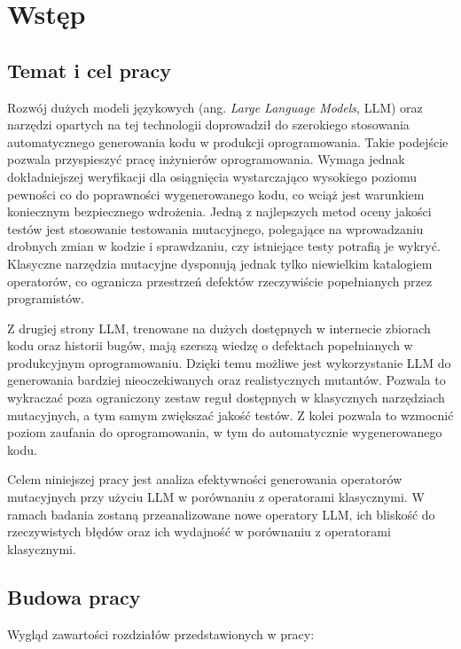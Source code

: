 \documentclass[12pt,a4paper,oldfontcommands]{memoir}
\theoremstyle{plain}
\theoremstyle{definition}
\theoremstyle{remark}
\begin{document}
    \clearpage
    \openany
    \chapter{Wstęp}
    \openright
    \section{Temat i cel pracy}

    Rozwój dużych modeli językowych (ang. \textit{Large Language Models}, LLM) oraz narzędzi opartych na tej technologii doprowadził do szerokiego stosowania automatycznego generowania kodu w produkcji oprogramowania.
    Takie podejście pozwala przyspieszyć pracę inżynierów oprogramowania.
    Wymaga jednak dokładniejszej weryfikacji dla osiągnięcia wystarczająco wysokiego poziomu pewności co do poprawności wygenerowanego kodu, co wciąż jest warunkiem koniecznym bezpiecznego wdrożenia.
    Jedną z najlepszych metod oceny jakości testów jest stosowanie testowania mutacyjnego, polegające na wprowadzaniu drobnych zmian w kodzie i sprawdzaniu, czy istniejące testy potrafią je wykryć.
    Klasyczne narzędzia mutacyjne dysponują jednak tylko niewielkim katalogiem operatorów, co ogranicza przestrzeń defektów rzeczywiście popełnianych przez programistów.

    Z drugiej strony LLM, trenowane na dużych dostępnych w internecie zbiorach kodu oraz historii bugów, mają szerszą wiedzę o defektach popełnianych w produkcyjnym oprogramowaniu.
    Dzięki temu możliwe jest wykorzystanie LLM do generowania bardziej nieoczekiwanych oraz realistycznych mutantów.
    Pozwala to wykraczać poza ograniczony zestaw reguł dostępnych w klasycznych narzędziach mutacyjnych, a tym samym zwiększać jakość testów.
    Z kolei pozwala to wzmocnić poziom zaufania do oprogramowania, w tym do automatycznie wygenerowanego kodu.

    Celem niniejszej pracy jest analiza efektywności generowania operatorów mutacyjnych przy użyciu LLM w porównaniu z operatorami klasycznymi.
    W ramach badania zostaną przeanalizowane nowe operatory LLM, ich bliskość do rzeczywistych błędów oraz ich wydajność w porównaniu z operatorami klasycznymi.

    \section{Budowa pracy}

    Wygląd zawartości rozdziałów przedstawionych w pracy:
\end{document}

